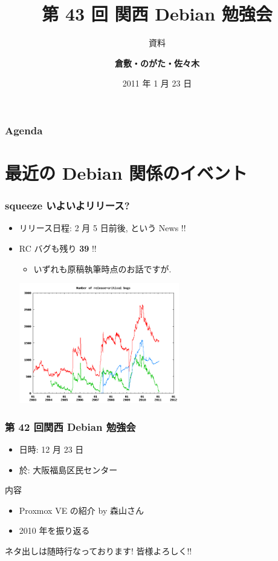 \documentclass[cjk,dvipdfmx,12pt,%
hyperref={bookmarks=true,bookmarksnumbered=true,bookmarksopen=false,%
colorlinks=false,%
pdftitle={第 43 回 関西 Debian 勉強会},%
pdfauthor={倉敷・のがた・佐々木},%
pdfsubject={資料},%
}]{beamer}
\title{第 43 回 関西 Debian 勉強会}
\subtitle{{\scriptsize 資料}}
\author[佐々木 洋平]{{\large\bf 倉敷・のがた・佐々木}}
\institute[Debian JP]{{\normalsize\tt 関西 Debian 勉強会}}
\date{{\small 2011 年 1 月 23 日}}
\begin{document}
\settitleslide
\begin{frame}
\titlepage
\end{frame}
\setdefaultslide

\begin{frame}[fragile]
\frametitle{Agenda}

\tableofcontents

\end{frame}

\section{最近の Debian 関係のイベント}



\begin{frame}[fragile]
\frametitle{squeeze いよいよリリース?}

\begin{itemize}
\item リリース日程: 2 月 5 日前後, という News !!
\item RC バグも残り \textbf{39} !!
  \begin{itemize}
  \item いずれも原稿執筆時点のお話ですが.
  \end{itemize}
\centering
\includegraphics[width=0.55\textwidth]{./image201101/rc-status-20110123.png}
\end{itemize}
\end{frame}

\begin{frame}[fragile]
\frametitle{第 42 回関西 Debian 勉強会}

\begin{itemize}
\item 日時: 12 月 23 日
\item 於: 大阪福島区民センター
\end{itemize}

\begin{block}{内容}
  \begin{itemize}
  \item Proxmox VE の紹介 by 森山さん
  \item 2010 年を振り返る
  \end{itemize}
\end{block}
ネタ出しは随時行なっております! 皆様よろしく!!
\end{frame}
\end{document}
